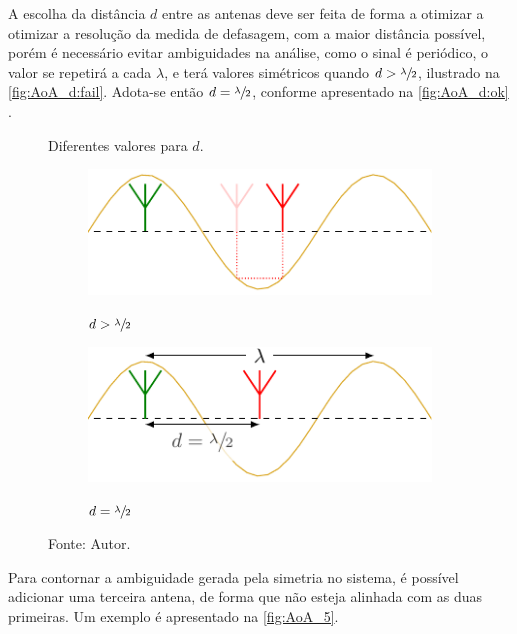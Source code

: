 A escolha da distância $d$ entre as antenas deve ser feita de forma a otimizar a otimizar a resolução da medida de defasagem, com a maior distância possível, porém é necessário evitar ambiguidades na análise, como o sinal é periódico, o valor se repetirá a cada $\lambda$, e terá valores simétricos quando $d > \sfrac{\lambda}{2}$, ilustrado na \autoref{fig:AoA_d:fail}.
Adota-se então $d=\sfrac{\lambda}{2}$, conforme apresentado na \autoref{fig:AoA_d:ok} \cite{bensky2016wireless, horst2021localization}.

\begin{figure}
    \caption{Diferentes valores para $d$.}
    \label{fig:AoA_d}

    \hfill
    \begin{subfigure}[b]{0.45\textwidth}
        \centering
        \caption{$d > \sfrac{\lambda}{2}$}
        \includegraphics{../pictures/AoA_0_fail.pdf}
        \label{fig:AoA_d:fail}
    \end{subfigure}
    \hfill
    \begin{subfigure}[b]{0.45\textwidth}
        \centering
        \caption{$d = \sfrac{\lambda}{2}$}
        \includegraphics{../pictures/AoA_0.pdf}
        \label{fig:AoA_d:ok}
    \end{subfigure}
    \hfill

    \caption*{Fonte: Autor.}
\end{figure}

Para contornar a ambiguidade gerada pela simetria no sistema, é possível adicionar uma terceira antena, de forma que não esteja alinhada com as duas primeiras.
Um exemplo é apresentado na \autoref{fig:AoA_5}.

